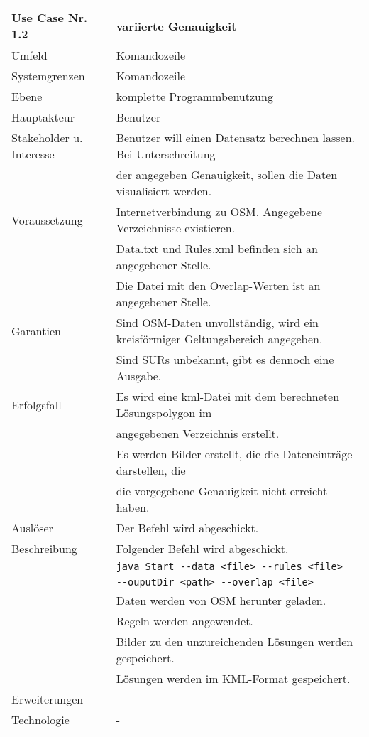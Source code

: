 \begin{tabular}{| l | l |}
 \hline
 \textbf{Use Case Nr. 1.2} & variierte Genauigkeit \\
 \hline
 Umfeld & Komandozeile\\
 \hline
 Systemgrenzen & Komandozeile\\
 \hline
 Ebene & komplette Programmbenutzung\\
 \hline
 Hauptakteur & Benutzer\\
 \hline
 Stakeholder u. Interesse & Benutzer will einen Datensatz berechnen lassen. Bei Unterschreitung\\
			  & der angegeben Genauigkeit, sollen die Daten visualisiert werden.\\
 \hline
 Voraussetzung & Internetverbindung zu OSM. Angegebene Verzeichnisse existieren.\\
	      & Data.txt und Rules.xml befinden sich an angegebener Stelle. \\
	      & Die Datei mit den Overlap-Werten ist an angegebener Stelle. \\
 \hline
 Garantien & Sind OSM-Daten unvollständig, wird ein kreisförmiger Geltungsbereich angegeben.\\
	  & Sind SURs unbekannt, gibt es dennoch eine Ausgabe.\\
 \hline
 Erfolgsfall & Es wird eine kml-Datei mit dem berechneten Lösungspolygon im\\
	    & angegebenen Verzeichnis erstellt.\\
	    & Es werden Bilder erstellt, die die Dateneinträge darstellen, die\\
	    & die vorgegebene Genauigkeit nicht erreicht haben.\\
 \hline
 Auslöser & Der Befehl wird abgeschickt.\\
 \hline
 Beschreibung & Folgender Befehl wird abgeschickt.\\
	    & \verb|java Start --data <file> --rules <file>|\\
	    & \hspace{24pt} \verb|--ouputDir <path> --overlap <file>|\\
	    & Daten werden von OSM herunter geladen.\\
	    & Regeln werden angewendet.\\
	    & Bilder zu den unzureichenden Lösungen werden gespeichert.\\
	    & Lösungen werden im KML-Format gespeichert.\\
 \hline
 Erweiterungen & -\\
 \hline
 Technologie & -\\
 \hline
\end{tabular}



